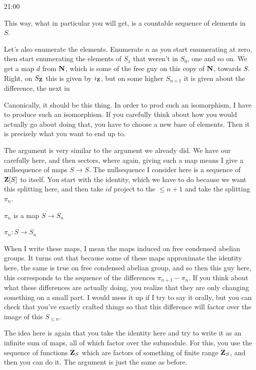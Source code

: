 \begin{unfinished}{21:00}
\begin{sketch}
This way, what in particular you will get, is a countable sequence of elements in $S$. 

Let's also enumerate the elements. Enumerate $n$ as you start enumerating at zero, then start enumerating the elements of $S_1$ that weren't in $S_0$, one and so on. We get a map $d$ from $\mathbf N$, which is some of the free guy on this copy of $\mathbf N$, towards $S$. Right, on $S_\mathbf Z$ this is given by $i_\mathbf Z$, but on some higher $S_{n+1}$ it is given about the difference, the next in

Canonically, it should be this thing. In order to prod such an isomorphism, I have to produce such an isomorphism. If you carefully think about how you would actually go about doing that, you have to choose a new base of elements. Then it is precisely what you want to end up to.

The argument is very similar to the argument we already did. We have our carefully here, and then sectors, where again, giving such a map means I give a nullsequence of maps $S \to S$. The nullsequence I consider here is a sequence of $\mathbf Z[S]$ to itself. 
You start with the identity, which we have to do because we want this splitting here, and then take $id$ project to the $\leq n+1$ and take the splitting $\pi_n$.

$\pi_n$ is a map $S \to S_n$

$\pi_n: S \to S_n$ %

When I write these maps, I mean the maps induced on free condensed abelian groups. 
It turns out that because some of these maps approximate the identity here, the same is true on free condensed abelian group, and so then this guy here, this corresponds to the sequence of the differences $\pi_{n+1} - \pi_n$. If you think about what these differences are actually doing, you realize that they are only changing something on a small part. I would mess it up if I try to say it orally, but you can check that you've exactly crafted things so that this difference will factor over the image of this $S_{\leq n}$.

The idea here is again that you take the identity here and try to write it as an infinite sum of maps, all of which factor over the submodule. For this, you use the sequence of functions $\mathbf Z_S$ which are factors of something of finite range $\mathbf Z_S$, and then you can do it. The argument is just the same as before.


\end{sketch}
\end{unfinished}
